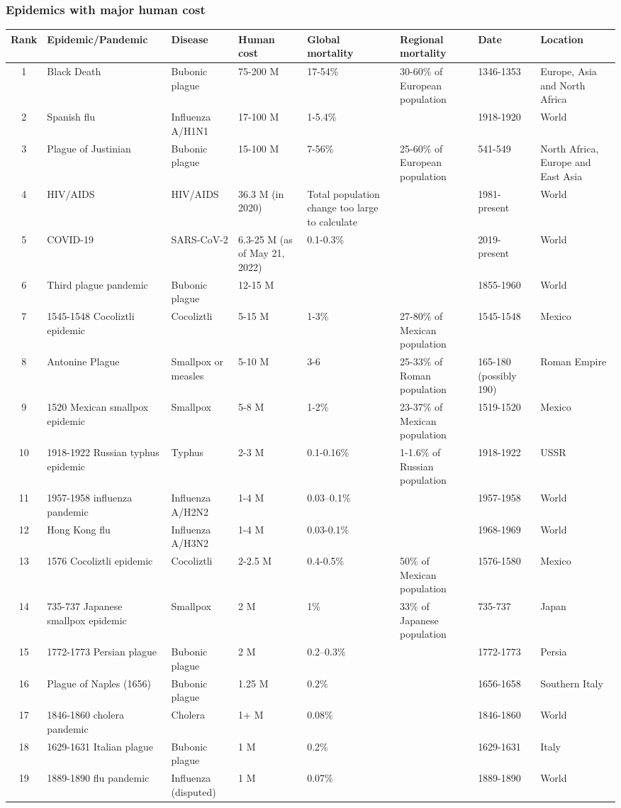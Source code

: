 \documentclass[aspectratio=169]{beamer}\usepackage[]{graphicx}\usepackage[]{xcolor}
\begin{document}
\begin{frame}[allowframebreaks]
\frametitle{Epidemics with major human cost}
\begin{longtable}{cp{4cm}p{2.5cm}p{2cm}p{1.5cm}p{3cm}p{2cm}p{2.5cm}}
\hline
Rank & Epidemic/Pandemic & Disease & Human cost & Global mortality & Regional mortality & Date & Location \\
\hline
1 & Black Death & Bubonic plague & 75-200 M & 17-54\% & 30-60\% of European population & 1346-1353 & Europe, Asia and North Africa \\
2 & Spanish flu & Influenza A/H1N1 & 17-100 M & 1-5.4\% & & 1918-1920 & World \\
3 & Plague of Justinian & Bubonic plague & 15-100 M & 7-56\% & 25-60\% of European population & 541-549 & North Africa, Europe and East Asia \\
4 & HIV/AIDS & HIV/AIDS & 36.3 M (in 2020) & \parbox{1.5cm}{Total population change too large to calculate} & & 1981-present & World \\
5 & COVID-19 & SARS-CoV-2 & 6.3-25 M (as of May 21, 2022) & 0.1-0.3\% & & 2019-present & World \\
6 & Third plague pandemic & Bubonic plague & 12-15 M & & & 1855-1960 & World \\
7 & 1545-1548 Cocoliztli epidemic & Cocoliztli & 5-15 M & 1-3\% & 27-80\% of Mexican population & 1545-1548 & Mexico \\
8 & Antonine Plague & Smallpox or measles & 5-10 M & 3-6 & 25-33\% of Roman population & 165-180 (possibly 190) & Roman Empire \\
9 & 1520 Mexican smallpox epidemic & Smallpox & 5-8 M & 1-2\% & 23-37\% of Mexican population & 1519-1520 & Mexico \\
10 & 1918-1922 Russian typhus epidemic & Typhus & 2-3 M & 0.1-0.16\% & 1-1.6\% of Russian population & 1918-1922 & USSR \\
11 & 1957-1958 influenza pandemic & Influenza A/H2N2 & 1-4 M & 0.03–0.1\% & & 1957-1958 & World \\
12 & Hong Kong flu & Influenza A/H3N2 & 1-4 M & 0.03-0.1\% & & 1968-1969 & World \\
13 & 1576 Cocoliztli epidemic & Cocoliztli & 2-2.5 M & 0.4-0.5\% & 50\% of Mexican population & 1576-1580 & Mexico \\
14 & 735-737 Japanese smallpox epidemic & Smallpox & 2 M & 1\% & 33\% of Japanese population & 735-737 & Japan \\
15 & 1772-1773 Persian plague & Bubonic plague & 2 M & 0.2–0.3\% & & 1772-1773 & Persia \\
16 & Plague of Naples (1656) & Bubonic plague & 1.25 M & 0.2\% & & 1656-1658 & Southern Italy \\
17 & 1846-1860 cholera pandemic & Cholera & 1+ M & 0.08\% & & 1846-1860 & World \\
18 & 1629-1631 Italian plague & Bubonic plague & 1 M & 0.2\% & & 1629-1631 & Italy \\
19 & 1889-1890 flu pandemic & Influenza (disputed) & 1 M & 0.07\% & & 1889-1890 & World \\
\hline
\end{longtable}
\end{frame}
    
\end{document}
